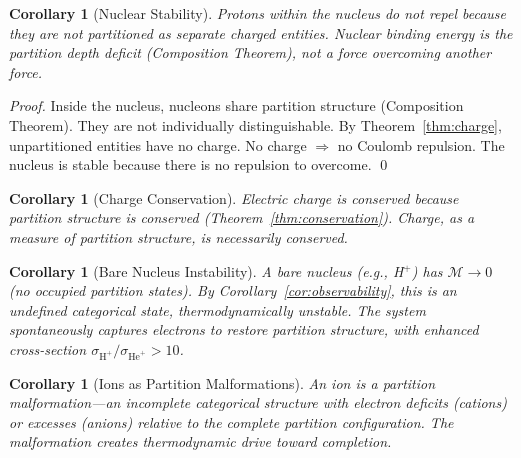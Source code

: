 \documentclass[twocolumn,10pt,a4paper]{article}
\newtheorem{corollary}[theorem]{Corollary}
\theoremstyle{definition}
\theoremstyle{remark}
\newcommand{\Depth}{\mathcal{M}}
\begin{document}
\begin{corollary}[Nuclear Stability]
\label{cor:nuclear-stability}
Protons within the nucleus do not repel because they are not partitioned as separate charged entities. Nuclear binding energy is the partition depth deficit (Composition Theorem), not a force overcoming another force.
\end{corollary}

\begin{proof}
Inside the nucleus, nucleons share partition structure (Composition Theorem). They are not individually distinguishable. By Theorem~\ref{thm:charge}, unpartitioned entities have no charge. No charge $\Rightarrow$ no Coulomb repulsion. The nucleus is stable because there is no repulsion to overcome. \qed
\end{proof}

\begin{corollary}[Charge Conservation]
\label{cor:charge-conservation}
Electric charge is conserved because partition structure is conserved (Theorem~\ref{thm:conservation}). Charge, as a measure of partition structure, is necessarily conserved.
\end{corollary}

\begin{corollary}[Bare Nucleus Instability]
\label{cor:bare-nucleus}
A bare nucleus (e.g., H$^+$) has $\Depth \to 0$ (no occupied partition states). By Corollary~\ref{cor:observability}, this is an undefined categorical state, thermodynamically unstable. The system spontaneously captures electrons to restore partition structure, with enhanced cross-section $\sigma_{\text{H}^+}/\sigma_{\text{He}^+} > 10$.
\end{corollary}

\begin{corollary}[Ions as Partition Malformations]
\label{cor:ions}
An ion is a partition malformation---an incomplete categorical structure with electron deficits (cations) or excesses (anions) relative to the complete partition configuration. The malformation creates thermodynamic drive toward completion.
\end{corollary}
\end{document}
